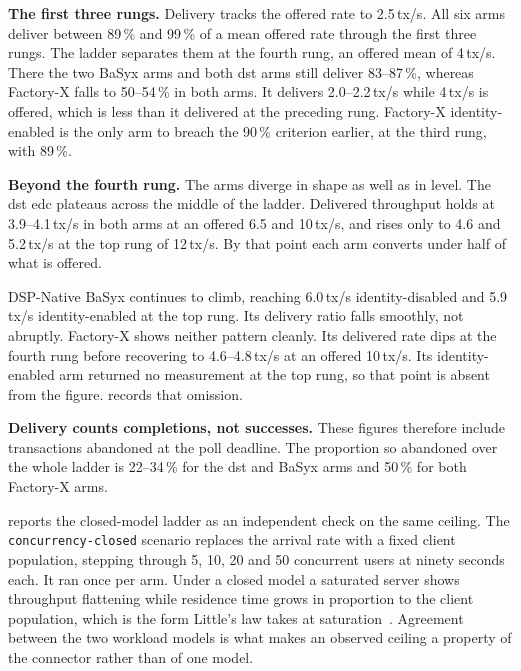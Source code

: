 \textbf{The first three rungs.} Delivery tracks the offered rate to 2.5\,tx/s. All six arms deliver between 89\,\% and 99\,\% of a mean offered rate through the first three rungs. The ladder separates them at the fourth rung, an offered mean of 4\,tx/s. There the two BaSyx arms and both \gls{dst} arms still deliver 83--87\,\%, whereas Factory-X falls to 50--54\,\% in both arms. It delivers 2.0--2.2\,tx/s while 4\,tx/s is offered, which is less than it delivered at the preceding rung. Factory-X identity-enabled is the only arm to breach the 90\,\% criterion earlier, at the third rung, with 89\,\%.

\textbf{Beyond the fourth rung.} The arms diverge in shape as well as in level. The \gls{dst} \gls{edc} plateaus across the middle of the ladder. Delivered throughput holds at 3.9--4.1\,tx/s in both arms at an offered 6.5 and 10\,tx/s, and rises only to 4.6 and 5.2\,tx/s at the top rung of 12\,tx/s. By that point each arm converts under half of what is offered.

DSP-Native BaSyx continues to climb, reaching 6.0\,tx/s identity-disabled and 5.9\,tx/s identity-enabled at the top rung. Its delivery ratio falls smoothly, not abruptly. Factory-X shows neither pattern cleanly. Its delivered rate dips at the fourth rung before recovering to 4.6--4.8\,tx/s at an offered 10\,tx/s. Its identity-enabled arm returned no measurement at the top rung, so that point is absent from the figure.  records that omission.

\textbf{Delivery counts completions, not successes.} These figures therefore include transactions abandoned at the poll deadline. The proportion so abandoned over the whole ladder is 22--34\,\% for the \gls{dst} and BaSyx arms and 50\,\% for both Factory-X arms.

\pagebreak

 reports the closed-model ladder as an independent check on the same ceiling. The \texttt{concurrency-closed} scenario replaces the arrival rate with a fixed client population, stepping through 5, 10, 20 and 50 concurrent users at ninety seconds each. It ran once per arm. Under a closed model a saturated server shows throughput flattening while residence time grows in proportion to the client population, which is the form Little's law takes at saturation~\citep{little1961proof}. Agreement between the two workload models is what makes an observed ceiling a property of the connector rather than of one model.

